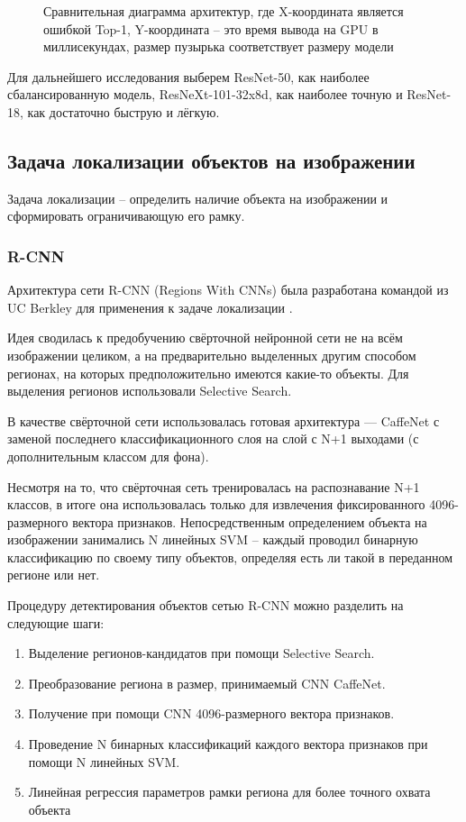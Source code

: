 \begin{figure}[H]
	\caption{Сравнительная диаграмма архитектур, где X-координата является ошибкой Top-1, Y-координата -- это время вывода на GPU в миллисекундах, размер пузырька соответствует размеру модели}
	\label{classification}
\end{figure}

Для дальнейшего исследования выберем ResNet-50, как наиболее сбалансированную модель,  ResNeXt-101-32x8d, как наиболее точную и ResNet-18, как достаточно быструю и лёгкую.

\subsection{Задача локализации объектов на изображении}
Задача локализации -- определить наличие объекта на изображении и сформировать ограничивающую его рамку.
\subsubsection{R-CNN}
Архитектура сети R-CNN (Regions With CNNs) была разработана командой из UC Berkley для применения к задаче локализации \cite{rcnn}. 

Идея сводилась к предобучению свёрточной нейронной сети не на всём изображении целиком, а на предварительно выделенных другим способом регионах, на которых предположительно имеются какие-то объекты. Для выделения регионов использовали  Selective Search. 

В качестве свёрточной сети использовалась готовая архитектура — CaffeNet с заменой последнего классификационного слоя на слой с N+1 выходами (с дополнительным классом для фона).

Несмотря на то, что свёрточная сеть тренировалась на распознавание N+1 классов, в итоге она использовалась только для извлечения фиксированного 4096-размерного вектора признаков. Непосредственным определением объекта на изображении занимались N линейных SVM -- каждый проводил бинарную классификацию по своему типу объектов, определяя есть ли такой в переданном регионе или нет.

Процедуру детектирования объектов сетью R-CNN можно разделить на следующие шаги:
\begin{enumerate} 
\item Выделение регионов-кандидатов при помощи Selective Search.
\item Преобразование региона в размер, принимаемый CNN CaffeNet.
\item Получение при помощи CNN 4096-размерного вектора признаков.
\item Проведение N бинарных классификаций каждого вектора признаков при помощи N линейных SVM.
\item Линейная регрессия параметров рамки региона для более точного охвата объекта 
\end{enumerate}

